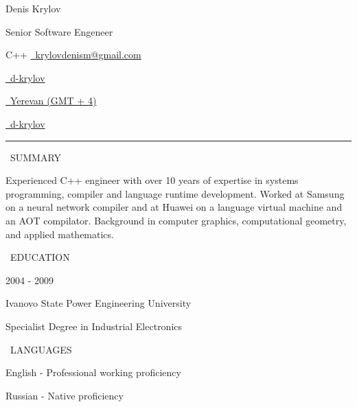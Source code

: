 \documentclass[11pt, a4paper]{cv_template}
\begin{document}

\begin{paracol}{3}

{\Huge Denis Krylov}

{\Large Senior Software Engeneer}

{\large C++}
\switchcolumn
\href{mailto:krylovdenism@gmail.com}{\Large \faAt \  krylovdenism@gmail.com} \par
\href{https://linkedin.com/in/d-krylov/}{\Large \faLinkedin \ d-krylov} \par
\href{https://greenwichmeantime.com/time/armenia/yerevan/}{\Large \faMapMarker \ Yerevan (GMT + 4)}

\switchcolumn

\href{https://github.com/d-krylov/}{\Large \faGithub \ d-krylov} \par
\end{paracol}

\vspace{10pt}

\hrule

\vspace{10pt}

\begin{paracol}{2}

{\Large \faUser \ SUMMARY}

{\large Experienced C++ engineer with over 10 years of expertise in systems programming, compiler and language runtime development. Worked at Samsung on  a neural network compiler and at Huawei on a language virtual machine and an AOT compilator. Background in computer graphics, computational geometry, and applied mathematics.}

\switchcolumn

{\Large \faUniversity \ EDUCATION}

{\large 2004 - 2009} \par
{\large Ivanovo State Power Engineering University} \par
{\large Specialist Degree in Industrial Electronics}

\vspace{5pt}

{\Large \faLanguage \ LANGUAGES}

{\large English - Professional working proficiency} \par
{\large Russian - Native proficiency}

\end{paracol}
\end{document}
